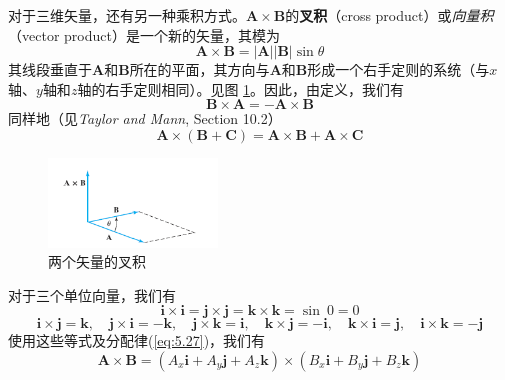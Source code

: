     对于三维矢量，还有另一种乘积方式。$\mathbf{A}\times\mathbf{B}$的\textbf{叉积}（cross product）或\textit{向量积}（vector product）是一个新的矢量，其模为
    \begin{equation}
        \mathbf{A}\times\mathbf{B} = \left|\mathbf{A}\right|\left|\mathbf{B}\right|\sin\theta
        \label{eq:5.26}
    \end{equation}
    其线段垂直于$\mathbf{A}$和$\mathbf{B}$所在的平面，其方向与$\mathbf{A}$和$\mathbf{B}$形成一个右手定则的系统（与$x$轴、$y$轴和$z$轴的右手定则相同）。见图 \ref{fig:5.3}。因此，由定义，我们有
    \begin{equation*}
        \mathbf{B}\times\mathbf{A} = -\mathbf{A}\times\mathbf{B}
    \end{equation*}
    同样地（见\textit{Taylor and Mann}, Section 10.2）
    \begin{equation}
        \mathbf{A}\times\left(\mathbf{B}+\mathbf{C}\right) = \mathbf{A}\times\mathbf{B} + \mathbf{A}\times\mathbf{C}
        \label{eq:5.27}
    \end{equation}
    \begin{figure}[h!]
        \centering
        \includegraphics[width=0.4\textwidth]{Figures/5.3.png}
        \caption{两个矢量的叉积}
        \label{fig:5.3}
    \end{figure}
    对于三个单位向量，我们有
    \begin{equation*}
        \mathbf{i}\times\mathbf{i} = \mathbf{j}\times\mathbf{j} = \mathbf{k}\times\mathbf{k} = \sin \: 0 = 0
    \end{equation*}
    \begin{equation*}
        \mathbf{i}\times\mathbf{j} = \mathbf{k}, \quad \mathbf{j}\times\mathbf{i} = -\mathbf{k}, \quad \mathbf{j}\times\mathbf{k} = \mathbf{i}, \quad \mathbf{k}\times\mathbf{j} = -\mathbf{i}, \quad \mathbf{k}\times\mathbf{i} = \mathbf{j}, \quad \mathbf{i}\times\mathbf{k} = -\mathbf{j}
    \end{equation*}
    使用这些等式及分配律(\ref{eq:5.27})，我们有
    \begin{equation*}
        \mathbf{A}\times\mathbf{B} = \left(A_x\mathbf{i} + A_y\mathbf{j} + A_z\mathbf{k}\right)\times\left(B_x\mathbf{i} + B_y\mathbf{j} + B_z\mathbf{k}\right)
    \end{equation*}
